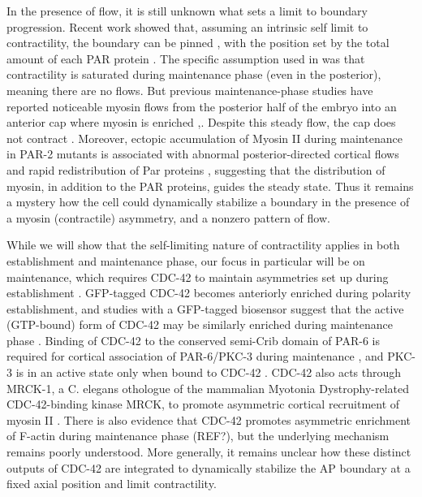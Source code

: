 \documentclass[11pt]{article}
\newcommand{\6}[1]{#1_{\text{6}}}
\newcommand{\3}[1]{#1_{\text{3}}}
\begin{document}
In the presence of flow, it is still unknown what sets a limit to boundary progression. Recent work showed that, assuming an intrinsic self limit to contractility, the boundary can be pinned \citep{gross2019guiding}, with the position set by the total amount of each PAR protein \citep{goehring2011polarization}. The specific assumption used in \citep{gross2019guiding} was that contractility is saturated during maintenance phase (even in the posterior), meaning there are no flows. But previous maintenance-phase studies have reported noticeable myosin flows from the posterior half of the embryo into an anterior cap where myosin is enriched \citep{sailer2015dynamic},. Despite this steady flow, the cap does not contract \citep{sailer2015dynamic}. Moreover, ectopic accumulation of Myosin II during maintenance in PAR-2 mutants is associated with abnormal posterior-directed cortical flows and rapid redistribution of Par proteins \citep{munro2004cortical}, suggesting that the distribution of myosin, in addition to the PAR proteins, guides the steady state. Thus it remains a mystery how the cell could dynamically stabilize a boundary in the presence of a myosin (contractile) asymmetry, and a nonzero pattern of flow.

While we will show that the self-limiting nature of contractility applies in both establishment and maintenance phase, our focus in particular will be on maintenance, which requires CDC-42 to maintain asymmetries set up during establishment \citep{kay2001cdc, gotta2001cdc,aceto2006interaction, schonegg2006cdc, motegi2006sequential}. GFP-tagged CDC-42 becomes anteriorly enriched during polarity establishment, and studies with a GFP-tagged biosensor suggest that the active (GTP-bound) form of CDC-42 may be similarly enriched during maintenance phase \citep{kumfer2010cgef}.  Binding of CDC-42 to the conserved semi-Crib domain of PAR-6 is required for cortical association of PAR-6/PKC-3 during maintenance \citep{aceto2006interaction}, and PKC-3 is in an active state only when bound to CDC-42 \citep{sailer2015dynamic,lang2017proteins,rodriguez2017apkc}. CDC-42 also acts through MRCK-1, a C. elegans othologue of the mammalian Myotonia Dystrophy-related CDC-42-binding kinase MRCK, to promote asymmetric cortical recruitment of myosin II \citep{kumfer2010cgef}.  There is also evidence that CDC-42 promotes asymmetric enrichment of F-actin during maintenance phase (REF?), but the underlying mechanism remains poorly understood.  More generally, it remains unclear how these distinct outputs of CDC-42 are integrated to dynamically stabilize the AP boundary at a fixed axial position and limit contractility. 
\end{document}

